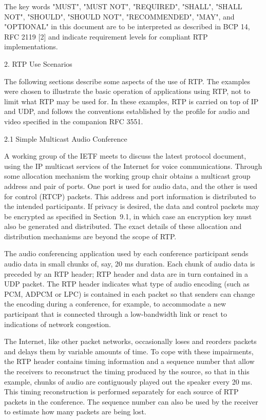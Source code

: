\documentclass{article}
\begin{document}
The key words "MUST", "MUST NOT", "REQUIRED", "SHALL", "SHALL NOT", "SHOULD", "SHOULD NOT", "RECOMMENDED", "MAY", and "OPTIONAL" in this document are to be interpreted as described in BCP 14, RFC 2119 [2] and indicate requirement levels for compliant RTP implementations.

2. RTP Use Scenarios

The following sections describe some aspects of the use of RTP.  The examples were chosen to illustrate the basic operation of applications using RTP, not to limit what RTP may be used for.  In these examples, RTP is carried on top of IP and UDP, and follows the conventions established by the profile for audio and video specified in the companion RFC 3551.

2.1 Simple Multicast Audio Conference

A working group of the IETF meets to discuss the latest protocol document, using the IP multicast services of the Internet for voice communications.  Through some allocation mechanism the working group chair obtains a multicast group address and pair of ports.  One port is used for audio data, and the other is used for control (RTCP) packets.  This address and port information is distributed to the intended participants.  If privacy is desired, the data and control packets may be encrypted as specified in Section~9.1, in which case an encryption key must also be generated and distributed.  The exact details of these allocation and distribution mechanisms are beyond the scope of RTP.

The audio conferencing application used by each conference participant sends audio data in small chunks of, say, 20 ms duration. Each chunk of audio data is preceded by an RTP header; RTP header and data are in turn contained in a UDP packet.  The RTP header indicates what type of audio encoding (such as PCM, ADPCM or LPC) is contained in each packet so that senders can change the encoding during a conference, for example, to accommodate a new participant that is connected through a low-bandwidth link or react to indications of network congestion.

The Internet, like other packet networks, occasionally loses and reorders packets and delays them by variable amounts of time.  To cope with these impairments, the RTP header contains timing information and a sequence number that allow the receivers to reconstruct the timing produced by the source, so that in this example, chunks of audio are contiguously played out the speaker every 20 ms.  This timing reconstruction is performed separately for each source of RTP packets in the conference.  The sequence number can also be used by the receiver to estimate how many packets are being lost.
\end{document}
